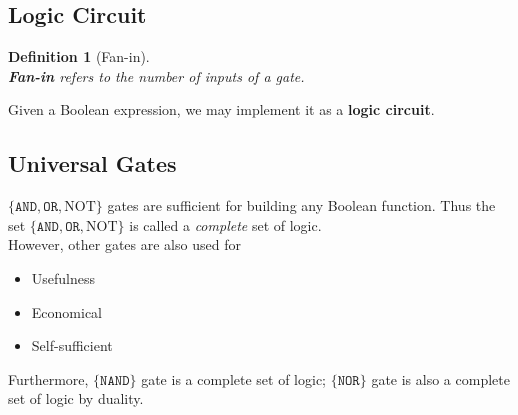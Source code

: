 \documentclass[12pt]{article}
\newtheorem{definition}{Definition}[section]
\theoremstyle{definition}
\begin{document}
\subsection{Logic Circuit}
\begin{definition}[Fan-in]
\hfill\\\normalfont \textbf{Fan-in} refers to the number of inputs of a gate.
\end{definition}
Given a Boolean expression, we may implement it as a \textbf{logic circuit}.
\subsection{Universal Gates}
$\{\texttt{AND},\texttt{OR},\text{NOT}\}$ gates are sufficient for building any Boolean function. Thus the set $\{\texttt{AND},\texttt{OR},\text{NOT}\}$ is called a \textit{complete} set of logic.\\
However, other gates are also used for 
\begin{itemize}
  \item Usefulness
  \item Economical
  \item Self-sufficient
\end{itemize}
Furthermore, $\{\texttt{NAND}\}$ gate is a complete set of logic; $\{\texttt{NOR}\}$ gate is also a complete set of logic by duality.
\end{document}
